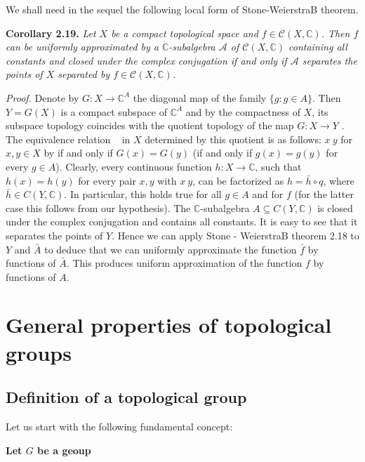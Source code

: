 \documentclass[12pt]{article}
\begin{document}
    
        We shall need in the sequel the following local form of Stone-WeierstraB theorem.


    \textbf{Corollary 2.19.} \emph{Let $ X $ be a compact topological space and $ f \in \mathcal{C}(X, \mathbb{C}) $. Then $ f $ can be uniformly approximated
    by a $ \mathbb{C} $-subalgebra $ \mathcal{A} $ of $ \mathcal{C}(X, \mathbb{C}) $ containing all constants and closed under the complex conjugation if and only
    if $ \mathcal{A} $ separates the points of $ X $ separated by $ f \in \mathcal{C}(X, \mathbb{C}) $.}
    
    
    \emph{Proof.} Denote by $ G : X \to \mathbb{C}^A $ the diagonal map of the family $\{g : g \in A\}$. Then $ Y = G(X) $ is a compact
    subspace of $ \mathbb{C}^A $ and by the compactness of $ X $, its subspace topology coincides with the quotient topology of
    the map $ G : X \to Y $ . The equivalence relation ~ in $ X $ determined by this quotient is as follows: $ x ~ y $ for
    $ x, y \in X $ by if and only if $ G(x) = G(y) $ (if and only if $ g(x) = g(y) $ for every $ g \in A $). Clearly, every continuous
    function $ h : X \to \mathbb{C} $, such that $ h(x) = h(y) $ for every pair $ x, y $ with $ x ~ y $, can be factorized as $ h = \bar{h} \circ q $, where
    $\bar{h} \in C(Y, \mathbb{C})$. In particular, this holds true for all $ g \in A $ and for $ f $ (for the latter case this follows from our
    hypothesis). The $\mathbb{C}$-subalgebra $ A \subseteq C(Y, \mathbb{C}) $ is closed under the complex conjugation and contains all constants.
    It is easy to see that it separates the points of $ Y $. Hence we can apply Stone - WeierstraB theorem 2.18 to $ Y $
    and $ \bar{A} $ to deduce that we can uniformly approximate the function $ \bar{f} $ by functions of $ \bar{A} $. This produces uniform
    approximation of the function $ f $ by functions of $ A $.
    


\section{General properties of topological groups}


    \subsection{Definition of a topological group}


    Let us start with the following fundamental concept:


    \textbf{Let $ G $ be a geoup}
        
\end{document}
